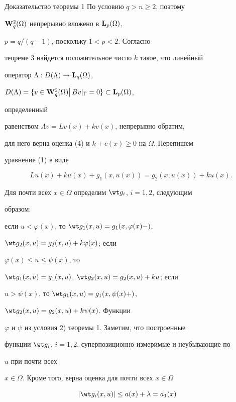 \begin{pf*}{Доказательство теоремы 1} По условию $q>n\ge 2$, поэтому 


$\bold W^2_q(\Omega)$ непрерывно вложено в $\bold L_p(\Omega)$, 


$p=q/(q-1)$, поскольку $1<p<2$. Согласно 


теореме 3 найдется положительное число $k$ такое, что линейный 


оператор $\Lambda:D(\Lambda)\to\bold L_q(\Omega)$, 


$D(\Lambda)=\{v\in\bold W^2_q(\Omega)\big|\,Bv|_\Gamma=0\} 


\subset\bold L_p(\Omega)$, 


определенный 


равенством $\Lambda v=Lv(x)+kv(x)$, непрерывно обратим, 


для него верна оценка (4) и $k+c(x)\ge 0$ на $\Omega$. Перепишем 


уравнение (1) в виде 


\begin{equation} 


Lu(x)+ku(x)+g_1(x,u(x))=g_2(x,u(x))+ku(x).\tag{1$'$} 


\end{equation} 


Для почти всех $x\in\Omega$ определим $\wt g_i$, $i=1,2$, следующим 


образом: 


если $u<\varphi(x)$, то $\wt g_1(x,u)=g_1(x,\varphi(x)-)$, 


$\wt g_2(x,u)=g_2(x,u)+k\varphi(x)$; если 


$\varphi(x)\le u\le\psi(x)$, то 


$\wt g_1(x,u)=g_1(x,u)$, $\wt g_2(x,u)=g_2(x,u)+ku$; если 


$u>\psi(x)$, то $\wt g_1(x,u)=g_1(x,\psi(x)+)$, 


$\wt g_2(x,u)=g_2(x,u)+k\psi(x)$. Функции 


$\varphi$ и $\psi$ из условия 2) теоремы 1. Заметим, что построенные 


функции $\wt g_i$, $i=1,2$, суперпозиционно измеримые и неубывающие по 


$u$ при почти всех 


$x\in\Omega$. Кроме того, верна оценка для почти всех $x\in\Omega$ 


\begin{equation} 


|\wt g_i(x,u)|\le a(x)+\lambda=a_1(x)\quad 



\end{equation}
\end{pf*}
